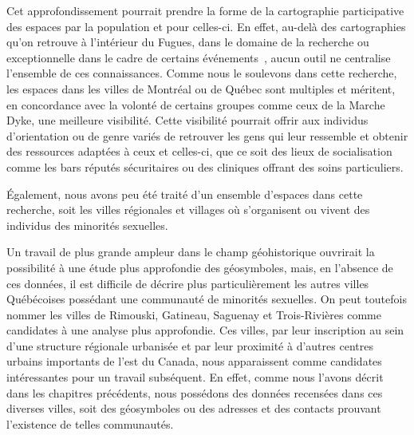 Cet approfondissement pourrait prendre la forme de la cartographie participative des espaces \lgbt{} par la population et pour celles-ci.
En effet, au-delà des cartographies qu'on retrouve à l'intérieur du Fugues, dans le domaine de la recherche  ou exceptionnelle dans le cadre de certains événements~\parencite{Pervers/Cite2015}, aucun outil ne centralise l'ensemble de ces connaissances.
Comme nous le soulevons dans cette recherche, les espaces \lgbt{} dans les villes de Montréal ou de Québec sont multiples et méritent, en concordance avec la volonté de certains groupes comme ceux de la Marche Dyke, une meilleure visibilité.
Cette visibilité pourrait offrir aux individus d'orientation ou de genre variés de retrouver les gens qui leur ressemble et obtenir des ressources adaptées à ceux et celles-ci, que ce soit des lieux de socialisation comme les bars réputés sécuritaires ou des cliniques offrant des soins particuliers.

Également, nous avons peu été traité d'un ensemble d'espaces dans cette recherche, soit les villes régionales et villages où s'organisent ou vivent des individus des minorités sexuelles.


Un travail de plus grande ampleur dans le champ géohistorique ouvrirait la possibilité à une étude plus approfondie des géosymboles, mais, en l'absence de ces données, il est difficile de décrire plus particulièrement les autres villes Québécoises possédant une communauté de minorités sexuelles.
On peut toutefois nommer les villes de Rimouski, Gatineau, Saguenay et Trois-Rivières comme candidates à une analyse plus approfondie.
Ces villes, par leur inscription au sein d'une structure régionale urbanisée et par leur proximité à d'autres centres urbains importants de l'est du Canada, nous apparaissent comme candidates intéressantes pour un travail subséquent.
En effet, comme nous l'avons décrit dans les chapitres précédents, nous possédons des données recensées dans ces diverses villes, soit des géosymboles ou des adresses et des contacts prouvant l'existence de telles communautés.


